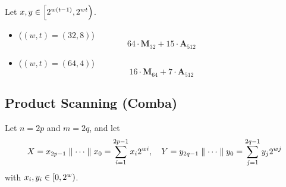 \begin{example}
	Let $x,y\in\intco{2^{w(t-1)},2^{wt}}$.
	\begin{itemize}
		\item[] ($(w,t)=(32,8)$) \[
		64\cdot\textbf{M}_{32} + 15\cdot\textbf{A}_{512}
		\]
		\item[] ($(w,t)=(64,4)$) \[
		16\cdot\textbf{M}_{64} + 7\cdot\textbf{A}_{512}
		\]
	\end{itemize}
\end{example}

\newpage
\subsection{Product Scanning (Comba)}
Let $n=2p$ and $m=2q$, and let \begin{align*}
X=x_{2p-1}\parallel\cdots\parallel x_0=\sum_{i=1}^{2p-1}x_i2^{wi},\quad
Y=y_{2q-1}\parallel\cdots\parallel y_0=\sum_{j=1}^{2q-1}y_j2^{wj}
\end{align*} with $x_i,y_i\in\intco{0,2^w}$.

